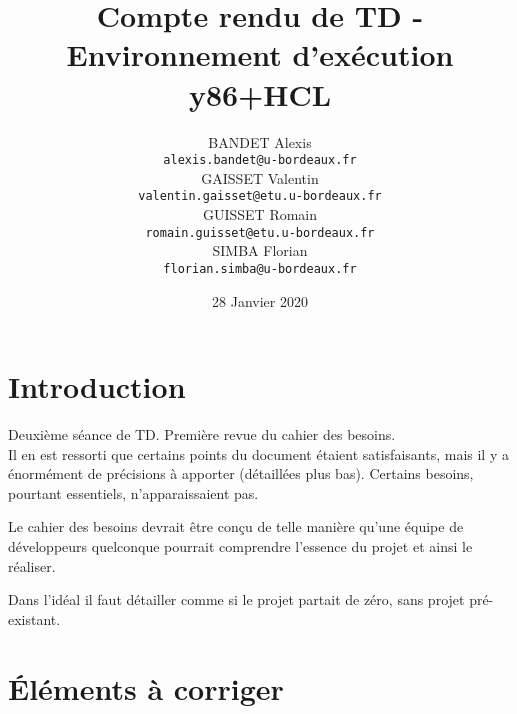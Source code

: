 \documentclass[french]{article}
\title{Compte rendu de TD - Environnement d'exécution y86+HCL}
\author{
    BANDET Alexis \\
    \texttt{alexis.bandet@u-bordeaux.fr} \\
    GAISSET Valentin \\
    \texttt{valentin.gaisset@etu.u-bordeaux.fr} \\
    GUISSET Romain \\
    \texttt{romain.guisset@etu.u-bordeaux.fr} \\
    SIMBA Florian \\
    \texttt{florian.simba@u-bordeaux.fr} \\
}
\date{28 Janvier 2020}
\begin{document}
\maketitle
\newpage
\tableofcontents
\newpage

\section{Introduction}

Deuxième séance de TD. Première revue du cahier des besoins.\\
Il en est ressorti que certains points du document étaient satisfaisants, mais il y a énormément de précisions à apporter (détaillées plus bas). Certains besoins, pourtant essentiels, n'apparaissaient pas.

Le cahier des besoins devrait être conçu de telle manière qu'une équipe de développeurs quelconque pourrait comprendre l'essence du projet et ainsi le réaliser.

Dans l'idéal il faut détailler comme si le projet partait de zéro, sans projet pré-existant.

\section{Éléments à corriger}
\end{document}
